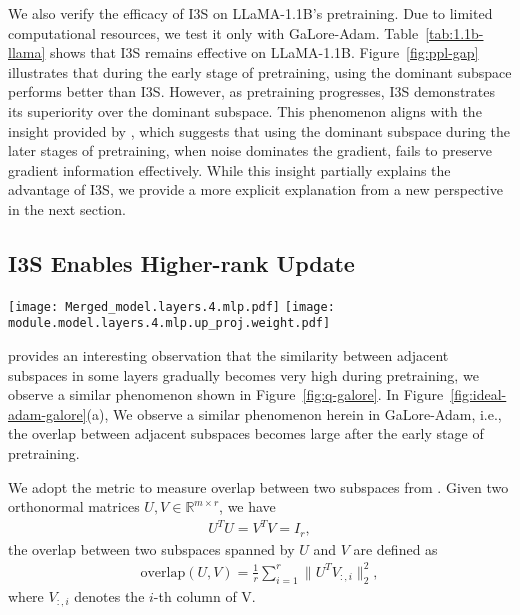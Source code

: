 We also verify the efficacy of I3S on LLaMA-1.1B's pretraining. Due to limited computational resources, we test it only with GaLore-Adam. Table~\ref{tab:1.1b-llama} shows that I3S remains effective on LLaMA-1.1B. Figure~\ref{fig:ppl-gap} illustrates that during the early stage of pretraining, using the dominant subspace performs better than I3S. However, as pretraining progresses, I3S demonstrates its superiority over the dominant subspace. This phenomenon aligns with the insight provided by \cite{he2024subspace}, which suggests that using the dominant subspace during the later stages of pretraining, when noise dominates the gradient, fails to preserve gradient information effectively. While this insight partially explains the advantage of I3S, we provide a more explicit explanation from a new perspective in the next section.


\subsection{I3S Enables Higher-rank Update}

\begin{figure*}[!ht]
    \centering
    \subfloat
    {\texttt{[image: Merged\_model.layers.4.mlp.pdf]}
    }
    \subfloat
    {
    \texttt{[image: module.model.layers.4.mlp.up\_proj.weight.pdf]}
    }
    \caption{a). The left figure shows the subspace overlap between adjacent subspaces in GaLore-Adam and GaLore-I3S-Adam during pretraining on the LLaMA-60M model. The definition of subspace overlap is given in Eq.~\eqref{eq:overlap}. b). The right figure shows normalized singular values of the weight difference between the 28k-step checkpoint and 30k-step checkpoint during pretraining on the LLaMA-60M model.}
    \label{fig:ideal-adam-galore}
\end{figure*} 

\cite{zhang2024q-galore} provides an interesting observation that the similarity between adjacent subspaces in some layers gradually becomes very high during pretraining, we observe a similar phenomenon shown in Figure~\ref{fig:q-galore}. In Figure~\ref{fig:ideal-adam-galore}(a), We observe a similar phenomenon herein in GaLore-Adam, i.e., the overlap between adjacent subspaces becomes large after the early stage of pretraining. 

We adopt the metric to measure overlap between two subspaces from \cite{gur2018gradient}. Given two orthonormal matrices $U, V \in \mathbb{R}^{m \times r}$, we have
\begin{align*}
    U^T U=V^T V=I_r,
\end{align*}
the overlap between two subspaces spanned by $U$ and $V$ are defined as
\begin{align}
\label{eq:overlap}
    \text{overlap}(U, V) = \frac{1}{r}\sum_{i=1}^{r} \|U^{T}V_{:,i}\|_2^2, 
\end{align}
where $V_{:,i}$ denotes the $i$-th column of V.

